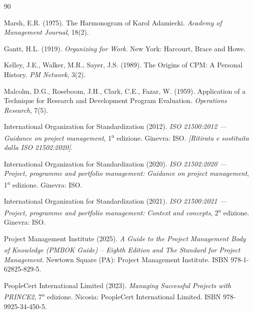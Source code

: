 \begin{thebibliography}{90}
\rhead[\fancyplain{}{\bfseries \leftmark}]{\fancyplain{}{\bfseries
\thepage}}



 Marsh, E.R. (1975). The Harmonogram of Karol Adamiecki.
  \emph{Academy of Management Journal}, 18(2).

 Gantt, H.L. (1919). \emph{Organizing for Work}. New York:
  Harcourt, Brace and Howe.

 Kelley, J.E., Walker, M.R., Sayer, J.S. (1989). The Origins
  of CPM: A Personal History. \emph{PM Network}, 3(2).

 Malcolm, D.G., Roseboom, J.H., Clark, C.E., Fazar, W.
  (1959). Application of a Technique for Research and Development Program
  Evaluation. \emph{Operations Research}, 7(5).

 International Organization for Standardization (2012).
  \emph{ISO 21500:2012 --- Guidance on project management}, 1\textsuperscript{a}
  edizione. Ginevra: ISO. \emph{[Ritirata e sostituita dalla ISO 21502:2020]}.

 International Organization for Standardization (2020).
  \emph{ISO 21502:2020 --- Project, programme and portfolio management: Guidance
  on project management}, 1\textsuperscript{a} edizione. Ginevra: ISO.

 International Organization for Standardization (2021).
  \emph{ISO 21500:2021 --- Project, programme and portfolio management: Context
  and concepts}, 2\textsuperscript{a} edizione. Ginevra: ISO.

 Project Management Institute (2025). \emph{A Guide to the
  Project Management Body of Knowledge (PMBOK\textsuperscript{\textregistered}
  Guide) -- Eighth Edition and The Standard for Project Management}. Newtown
  Square (PA): Project Management Institute. ISBN 978-1-62825-829-5.

 PeopleCert International Limited (2023). \emph{Managing
  Successful Projects with PRINCE2}, 7\textsuperscript{a} edizione. Nicosia:
  PeopleCert International Limited. ISBN 978-9925-34-450-5.



\end{thebibliography}
